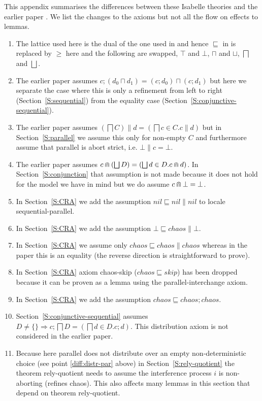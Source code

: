 \documentclass[12pt,a4paper]{article}
\newcommand{\Abort}{\bot}
\newcommand{\refsto}{\mathrel{\sqsubseteq}}
\newcommand{\nondet}{\mathbin{\sqcap}}
\newcommand{\Nondet}{\mathop{\bigsqcap}}
\newcommand{\Abort}{\top}
\newcommand{\refsto}{\mathrel{\ge}}
\newcommand{\nondet}{\mathbin{\sqcup}}
\newcommand{\Nondet}{\mathop{\bigsqcup}}
\newcommand{\Seq}{\mathbin{;}}
\newcommand{\together}{\mathbin{\doublecap}}
\begin{document}
This appendix summarises the differences between these Isabelle theories and
the earlier paper \cite{AFfGRGRACP}.
We list the changes to the axioms but not all the flow on effects to lemmas.

\begin{enumerate}
\item
The lattice used here is the dual of the one used in \cite{AFfGRGRACP}
and hence 
$\sqsubseteq$ in \cite{AFfGRGRACP} is replaced by $\ge$ here
and the following are swapped,
$\top$ and $\bot$,
$\sqcap$ and $\sqcup$,
$\bigsqcap$ and $\bigsqcup$.
\item
The earlier paper assumes $c \Seq (d_0 \nondet d_1) = (c \Seq d_0) \nondet (c \Seq d_1)$
but here we separate the case where this is only a refinement from left to right (Section~\ref{S:sequential})
from the equality case (Section~\ref{S:conjunctive-sequential}).
\item\label{diff:distr-par}
The earlier paper assumes $(\Nondet C) \parallel d = (\Nondet c \in C . c \parallel d)$
but in Section~\ref{S:parallel}  we assume this only for non-empty $C$ and furthermore assume 
that parallel is abort strict, i.e. $\Abort \parallel c = \Abort$.
\item
The earlier paper assumes $c \together (\bigsqcup D) = (\bigsqcup d \in D . c \together d)$.
In Section~\ref{S:conjunction} that assumption is not made
because it does not hold for the model we have in mind \cite{DaSMfaWSLwC}
but we do assume $c \together \Abort = \Abort$.
\item
In Section~\ref{S:CRA} we add the assumption $nil \refsto nil \parallel nil$ to locale sequential-parallel.
\item
In Section~\ref{S:CRA} we add the assumption $\Abort \refsto chaos \parallel \Abort$.
\item
In Section~\ref{S:CRA} we assume only $chaos \refsto chaos \parallel chaos$
whereas in the paper this is an equality (the reverse direction is straightforward to prove).
\item
In Section~\ref{S:CRA} axiom chaos-skip ($chaos \refsto skip$) has been dropped
because it can be proven as a lemma using the parallel-interchange axiom.
\item
In Section~\ref{S:CRA} we add the assumption $chaos \refsto chaos \Seq chaos$.
\item
Section~\ref{S:conjunctive-sequential} assumes
$D \neq \{\} \Rightarrow c \Seq \Nondet D = (\Nondet d \in D . c \Seq d)$.
This distribution axiom is not considered in the earlier paper.
\item
Because here parallel does not distribute over an empty non-deterministic choice
(see point \ref{diff:distr-par} above)
in Section~\ref{S:rely-quotient} the theorem rely-quotient needs to assume the interference process $i$
is non-aborting (refines chaos). This also affects many lemmas in this section that depend on 
theorem rely-quotient.
\end{enumerate}




\end{document}
